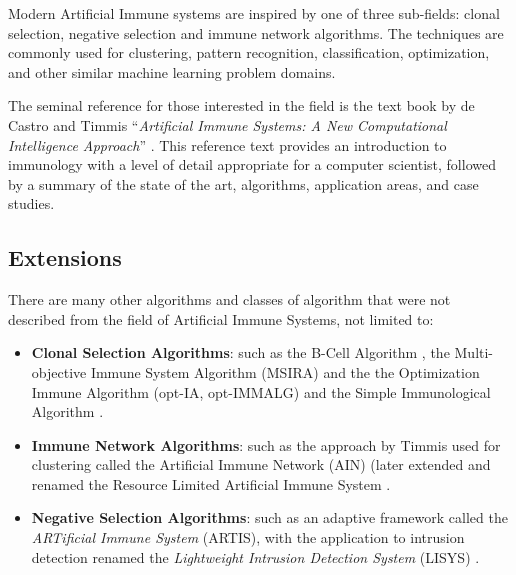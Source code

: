 \begin{bibunit}
Modern Artificial Immune systems are inspired by one of three sub-fields: clonal selection, negative selection and immune network algorithms. The techniques are commonly used for clustering, pattern recognition, classification, optimization, and other similar machine learning problem domains.

The seminal reference for those interested in the field is the text book by de Castro and Timmis ``\emph{Artificial Immune Systems: A New Computational Intelligence Approach}'' \cite{Castro2002}. This reference text provides an introduction to immunology with a level of detail appropriate for a computer scientist, followed by a summary of the state of the art, algorithms, application areas, and case studies.

% 
% 
\subsection{Extensions}
There are many other algorithms and classes of algorithm that were not described from the field of Artificial Immune Systems, not limited to:

\begin{itemize}
	\item \textbf{Clonal Selection Algorithms}: such as the B-Cell Algorithm \cite{Kelsey2003}, the Multi-objective Immune System Algorithm (MSIRA) \cite{Coello2002, Cortes2003} and the the Optimization Immune Algorithm (opt-IA, opt-IMMALG) \cite{Cutello2002a, Cutello2002} and the Simple Immunological Algorithm \cite{Cutello2005b}.
	\item \textbf{Immune Network Algorithms}: such as the approach by Timmis used for clustering called the Artificial Immune Network (AIN) \cite{Timmis2000}  (later extended and renamed the Resource Limited Artificial Immune System \cite{Timmis2001, Timmis2000a}.
	\item \textbf{Negative Selection Algorithms}: such as an adaptive framework called the \emph{ARTificial Immune System} (ARTIS), with the application to intrusion detection renamed the \emph{Lightweight Intrusion Detection System} (LISYS) \cite{Hofmeyr1999, Hofmeyr2000}.
\end{itemize}


\putbib
\end{bibunit}

